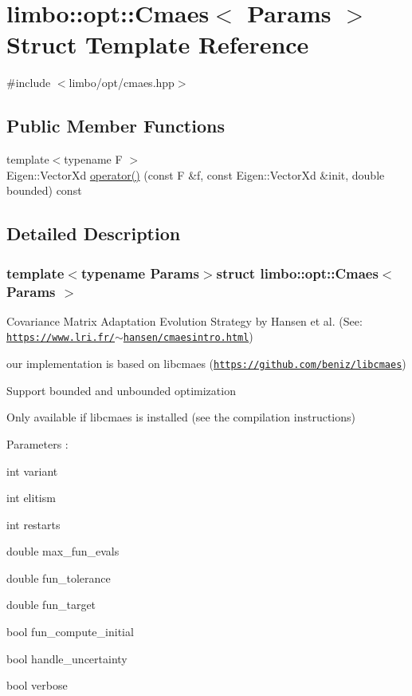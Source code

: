 \hypertarget{structlimbo_1_1opt_1_1_cmaes}{}\section{limbo\+:\+:opt\+:\+:Cmaes$<$ Params $>$ Struct Template Reference}
\label{structlimbo_1_1opt_1_1_cmaes}


{\ttfamily \#include $<$limbo/opt/cmaes.\+hpp$>$}

\subsection*{Public Member Functions}
\begin{DoxyCompactItemize}
\item 
{\footnotesize template$<$typename F $>$ }\\Eigen\+::\+Vector\+Xd \hyperlink{structlimbo_1_1opt_1_1_cmaes_a47ee6970bd2300108c83281ea6fced17}{operator()} (const F \&f, const Eigen\+::\+Vector\+Xd \&init, double bounded) const 
\end{DoxyCompactItemize}


\subsection{Detailed Description}
\subsubsection*{template$<$typename Params$>$struct limbo\+::opt\+::\+Cmaes$<$ Params $>$}

Covariance Matrix Adaptation Evolution Strategy by Hansen et al. (See\+: \href{https://www.lri.fr/~hansen/cmaesintro.html}{\tt https\+://www.\+lri.\+fr/$\sim$hansen/cmaesintro.\+html})
\begin{DoxyItemize}
\item our implementation is based on libcmaes (\href{https://github.com/beniz/libcmaes}{\tt https\+://github.\+com/beniz/libcmaes})
\item Support bounded and unbounded optimization
\item Only available if libcmaes is installed (see the compilation instructions)
\item Parameters \+:
\begin{DoxyItemize}
\item int variant
\item int elitism
\item int restarts
\item double max\+\_\+fun\+\_\+evals
\item double fun\+\_\+tolerance
\item double fun\+\_\+target
\item bool fun\+\_\+compute\+\_\+initial
\item bool handle\+\_\+uncertainty
\item bool verbose 
\end{DoxyItemize}
\end{DoxyItemize}

